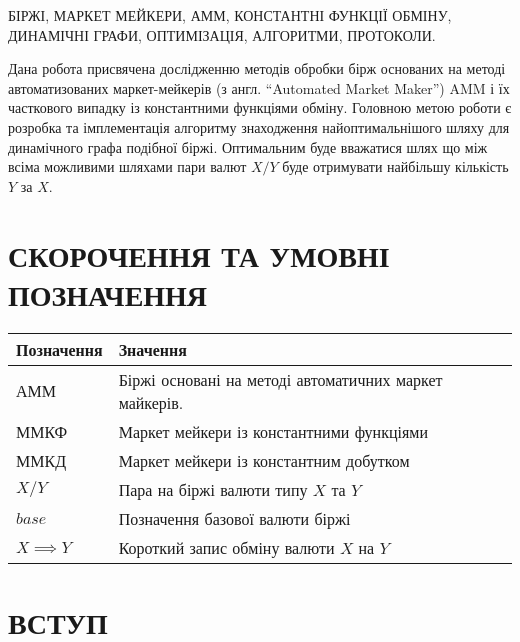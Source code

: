 \documentclass[14pt]{extarticle}
\begin{document}
БІРЖІ, МАРКЕТ МЕЙКЕРИ, АММ, КОНСТАНТНІ ФУНКЦІЇ ОБМІНУ, ДИНАМІЧНІ ГРАФИ,
ОПТИМІЗАЦІЯ, АЛГОРИТМИ, ПРОТОКОЛИ.

Дана робота присвячена дослідженню методів обробки бірж основаних на методі
автоматизованих маркет-мейкерів (з англ. ``Automated Market Maker'') AMM і їх
часткового випадку із константними функціями обміну. Головною метою роботи є
розробка та імплементація алгоритму знаходження найоптимальнішого шляху для
динамічного графа подібної біржі. Оптимальним буде вважатися шлях що між всіма
можливими шляхами пари валют $X/Y$ буде отримувати найбільшу кількість $Y$ за
$X$.

\newpage

\renewcommand{\contentsname}{ЗМІСТ}
\setcounter{tocdepth}{2}
\tableofcontents
\newpage

\section*{СКОРОЧЕННЯ ТА УМОВНІ ПОЗНАЧЕННЯ}\label{sec:notation}

\begin{center}
	\begin{tabular}{ll}
		Позначення       & Значення                                               \\[0pt]
		\hline{}
		АММ              & Біржі основані на методі автоматичних маркет майкерів. \\[0pt]
		ММКФ             & Маркет мейкери із константними функціями               \\[0pt]
		ММКД             & Маркет мейкери із константним добутком                 \\[0pt]
		\(X/Y\)          & Пара на біржі валюти типу \(X\) та \(Y\)               \\[0pt]
		$base$           & Позначення базової валюти біржі                        \\[0pt]
		\(X \implies Y\) & Короткий запис обміну валюти \(X\) на \(Y\)            \\[0pt]
	\end{tabular}
\end{center}

\newpage

\section{ВСТУП}\label{sec:intro}


\newpage
\end{document}
